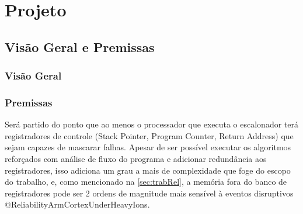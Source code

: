 

\chapter{Projeto}
\label{cap:proj}

\section{Visão Geral e Premissas}

\subsection{Visão Geral}

\subsection{Premissas}

Será partido do ponto que ao menos o processador que executa o escalonador terá registradores de controle (Stack Pointer, Program Counter, Return Address) que sejam capazes de mascarar falhas. Apesar de ser possível executar os algoritmos reforçados com análise de fluxo do programa e adicionar redundância aos registradores, isso adiciona um grau a mais de complexidade que foge do escopo do trabalho, e, como mencionado na \autoref{sec:trabRel}, a memória fora do banco de registradores pode ser 2 ordens de magnitude mais sensível à eventos disruptivos @ReliabilityArmCortexUnderHeavyIons.


